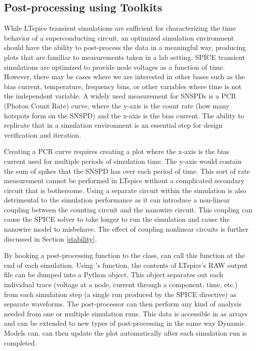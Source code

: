 \subsection{Post-processing using  Toolkits}

While LTspice transient simulations are sufficient for characterizing the time behavior of a superconducting 
circuit, an optimized simulation environment should have the ability to post-process the data 
in a meaningful way, producing plots that are familiar to measurements taken in a lab setting.
SPICE transient simulations are optimized to provide
 node voltages as a function of time. However, there may be cases where we are interested in other bases such as the bias current, temperature, frequency bins, or other variables where time is not the independent variable. A widely used measurement for SNSPDs is a PCR (Photon Count Rate) curve, where
the y-axis is the count rate (how many hotspots form on the SNSPD) and the x-axis is the bias current. The ability to replicate that in a simulation environment is an essential step for
design verification and iteration.

Creating a PCR curve requires creating a plot where the x-axis is the bias current used for multiple
periods of simulation time. The y-axis would contain the sum of spikes that the SNSPD has over each period
of time. This sort of rate measurement cannot be performed in LTspice without a complicated secondary circuit
that is bothersome. Using a separate circuit within the simulation is also detrimental to the simulation
performance as it can introduce a non-linear coupling between the counting circuit and the nanowire circuit. 
This coupling can cause the SPICE solver to take longer to run the simulation and cause the nanowire model to
misbehave. The effect of coupling nonlinear circuits is further discussed in Section \ref{stability}.

By hooking a post-processing function to the  class,  can call this 
function at the end of each simulation. Using 's 
function, the contents of LTspice's RAW output file can be dumped into a Python object. This object
separates out each individual trace (voltage at a node, current through a component, time, etc.)
from each simulation step (a single run produced by the  SPICE directive) as separate waveforms. The 
post-processor can then perform any kind of analysis needed from one or multiple simulation runs.
This data is accessible in  as
 arrays and can be extended to new types of post-processing in the same way Dynamic Models can.  can then update the plot automatically after each simulation run is completed.

